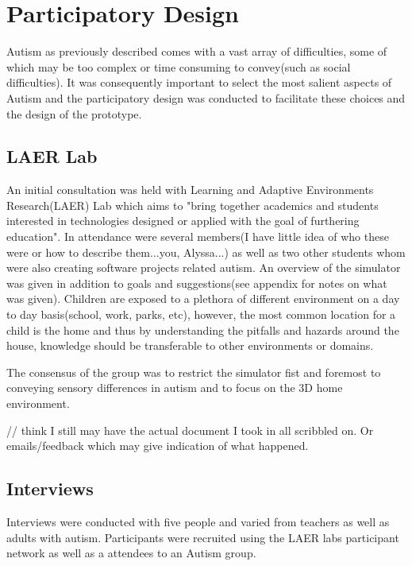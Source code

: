 \chapter{Participatory Design}
Autism as previously described comes with a vast array of difficulties, some of which may be too complex or time consuming to convey(such as social difficulties). It was consequently important to select the most salient aspects of Autism and the participatory design was conducted to facilitate these choices and the design of the prototype. 

\section{LAER Lab}
An initial consultation was held with Learning and Adaptive Environments Research(LAER) Lab which aims to "bring together academics and students interested in technologies designed or applied with the goal of furthering education". In attendance were several members(I have little idea of who these were or how to describe them...you, Alyssa...) as well as two other students whom were also creating software projects related autism. An overview of the simulator was given in addition to goals and suggestions(see appendix for notes on what was given). Children are exposed to a plethora of different environment on a day to day basis(school, work, parks, etc), however, the most common location for a child is the home and thus by understanding the pitfalls and hazards around the house, knowledge should be transferable to other environments or domains. 

The consensus of the group was to restrict the simulator fist and foremost to conveying sensory differences in autism and to focus on the 3D home environment.

// think I still may have the actual document I took in all scribbled on. Or emails/feedback which may give indication of what happened.

\section{Interviews}
Interviews were conducted with five people and varied from teachers as well as adults with autism. Participants were recruited using the LAER labs participant network as well as a attendees to an Autism group.

